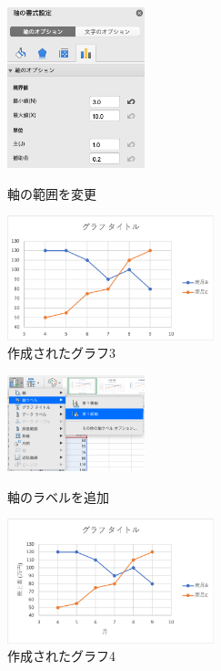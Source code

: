\begin{figure}[tb]
    \begin{minipage}{0.5\hsize}
        \centering
        \includegraphics[width=4cm]{chap2/line_range.png}
        \caption{軸の範囲を変更}
        \label{fig:line_range}
    \end{minipage}
    \begin{minipage}{0.5\hsize}
        \centering
        \includegraphics[width=6cm]{chap2/line3.png}
        \caption{作成されたグラフ3}
        \label{fig:line3}
    \end{minipage}
\end{figure}

\begin{figure}[tb]
    \begin{minipage}{0.5\hsize}
        \centering
        \includegraphics[width=4cm]{chap2/line_label.png}
        \caption{軸のラベルを追加}
        \label{fig:line_label}
    \end{minipage}
    \begin{minipage}{0.5\hsize}
        \centering
        \includegraphics[width=6cm]{chap2/line4.png}
        \caption{作成されたグラフ4}
        \label{fig:line4}
    \end{minipage}
\end{figure}

